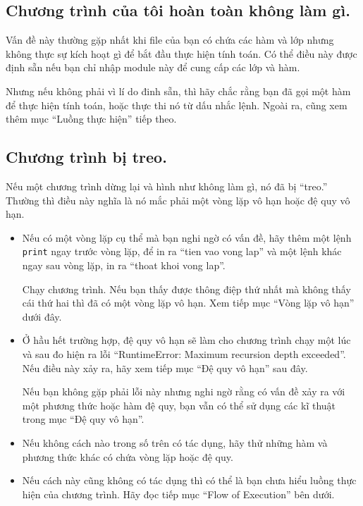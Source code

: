 \documentclass[11pt]{book}
\begin{document}
\subsection{Chương trình của tôi hoàn toàn không làm gì.}

Vấn đề này thường gặp nhất khi file của bạn có chứa các hàm và
lớp nhưng không thực sự kích hoạt gì để bắt đầu thực hiện tính toán.
Có thể điều này được định sẵn nếu bạn chỉ nhập module này để
cung cấp các lớp và hàm.

Nhưng nếu không phải vì lí do đinh sẵn, thì hãy chắc rằng bạn 
đã gọi một hàm để thực hiện tính toán, hoặc thực thi nó từ
dấu nhắc lệnh. Ngoài ra, cũng xem thêm mục ``Luồng thực hiện'' 
tiếp theo.


\subsection{Chương trình bị treo.}

Nếu một chương trình dừng lại và hình như không làm gì, nó đã bị ``treo.''
Thường thì điều này nghĩa là nó mắc phải một vòng lặp vô hạn hoặc
đệ quy vô hạn.

\begin{itemize}

\item Nếu có một vòng lặp cụ thể mà bạn nghi ngờ có vấn đề,
hãy thêm một lệnh {\tt print} ngay trước vòng lặp, để in ra
``tien vao vong lap'' và một lệnh khác ngay sau vòng lặp, in ra
``thoat khoi vong lap''.

Chạy chương trình. Nếu bạn thấy được thông điệp thứ nhất mà không thấy
cái thứ hai thì đã có một vòng lặp vô hạn. Xem tiếp mục ``Vòng lặp vô hạn''
dưới đây.

\item Ở hầu hết trường hợp, đệ quy vô hạn sẽ làm cho chương trình
chạy một lúc và sau đo hiện ra lỗi ``RuntimeError: Maximum
recursion depth exceeded''.  Nếu điều này xảy ra, hãy xem tiếp mục
``Đệ quy vô hạn'' sau đây.

Nếu bạn không gặp phải lỗi này nhưng nghi ngờ rằng có vấn đề xảy ra
với một phương thức hoặc hàm đệ quy, bạn vẫn có thể sử dụng các kĩ thuật
trong mục ``Đệ quy vô hạn''.

\item Nếu không cách nào trong số trên có tác dụng, hãy thử những
hàm và phương thức khác có chứa vòng lặp hoặc đệ quy.

\item Nếu cách này cũng không có tác dụng thì có thể là bạn chưa hiểu
luồng thực hiện của chương trình.
Hãy đọc tiếp mục ``Flow of Execution'' bên dưới.

\end{itemize}
\end{document}
